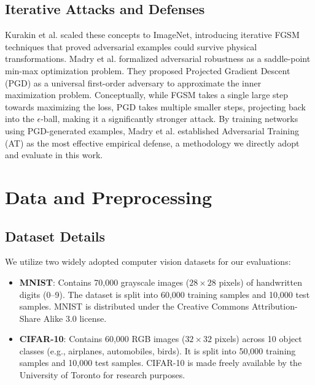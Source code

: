 \documentclass[conference,10pt]{IEEEtran}
\begin{document}
\subsection{Iterative Attacks and Defenses}
Kurakin et al. \cite{kurakin2017scale} scaled these concepts to ImageNet, introducing iterative FGSM techniques that proved adversarial examples could survive physical transformations. Madry et al. \cite{madry2018pgd} formalized adversarial robustness as a saddle-point min-max optimization problem. They proposed Projected Gradient Descent (PGD) as a universal first-order adversary to approximate the inner maximization problem. Conceptually, while FGSM takes a single large step towards maximizing the loss, PGD takes multiple smaller steps, projecting back into the $\epsilon$-ball, making it a significantly stronger attack. By training networks using PGD-generated examples, Madry et al. established Adversarial Training (AT) as the most effective empirical defense, a methodology we directly adopt and evaluate in this work.


\section{Data and Preprocessing}

\subsection{Dataset Details}
We utilize two widely adopted computer vision datasets for our evaluations:
\begin{itemize}
    \item \textbf{MNIST}: Contains 70,000 grayscale images ($28 \times 28$ pixels) of handwritten digits (0--9). The dataset is split into 60,000 training samples and 10,000 test samples. MNIST is distributed under the Creative Commons Attribution-Share Alike 3.0 license.
    \item \textbf{CIFAR-10}: Contains 60,000 RGB images ($32 \times 32$ pixels) across 10 object classes (e.g., airplanes, automobiles, birds). It is split into 50,000 training samples and 10,000 test samples. CIFAR-10 is made freely available by the University of Toronto for research purposes.
\end{itemize}
\end{document}
